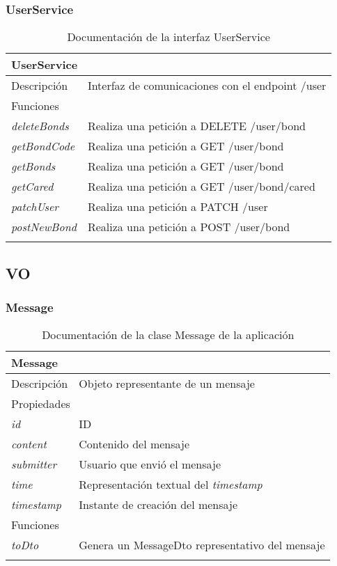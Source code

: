 \subsubsection{UserService}

\begin{longtable}{|p{} p{}|}
    \hline
    \multicolumn{2}{|l|}{UserService} \\ \hline \hline
    Descripción      & Interfaz de comunicaciones con el endpoint /user \\ \hline
    \multicolumn{2}{|l|}{Funciones} \\
    \emph{deleteBonds} & Realiza una petición a DELETE /user/bond \\
    \emph{getBondCode}  & Realiza una petición a GET /user/bond \\ 
    \emph{getBonds}  & Realiza una petición a GET /user/bond \\
    \emph{getCared}  & Realiza una petición a GET /user/bond/cared \\
    \emph{patchUser}  & Realiza una petición a PATCH /user \\
    \emph{postNewBond}  & Realiza una petición a POST /user/bond \\ \hline
    \caption{Documentación de la interfaz UserService}
    \label{dis:app:user_service}
\end{longtable}

\subsection{VO}

\subsubsection{Message}

\begin{longtable}{|p{} p{}|}
    \hline
    \multicolumn{2}{|l|}{\textbf{Message}} \\ \hline \hline
    Descripción      & Objeto representante de un mensaje \\ \hline
    \multicolumn{2}{|l|}{Propiedades} \\
    \emph{id}  & ID \\
    \emph{content}  & Contenido del mensaje \\
    \emph{submitter}  & Usuario que envió el mensaje \\
    \emph{time}  & Representación textual del \emph{timestamp} \\
    \emph{timestamp}  & Instante de creación del mensaje \\  \hline
    \multicolumn{2}{|l|}{Funciones} \\
    \emph{toDto}  & Genera un MessageDto representativo del mensaje \\ \hline
    \caption{Documentación de la clase Message de la aplicación}
    \label{dis:app:message}
\end{longtable}

